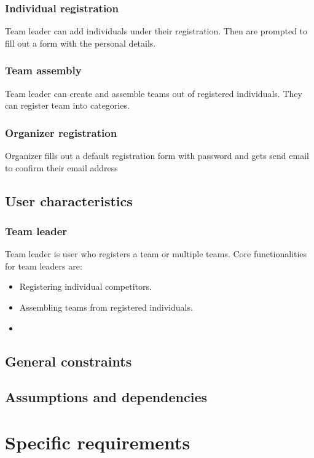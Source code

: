 \documentclass[a4paper]{article}
\begin{document}
	\subsubsection{Individual registration}
	Team leader can add individuals under their registration. Then are prompted to fill out a form with the personal details.
	\subsubsection{Team assembly}
	Team leader can create and assemble teams out of registered individuals. They can register team into categories.
	\subsubsection{Organizer registration}
	Organizer fills out a default registration form with password and gets send email to confirm their email address 
	\subsection{User characteristics}
	\label{sub:users}
	\subsubsection{Team leader}
	Team leader is user who registers a team or multiple teams. Core functionalities for team leaders are:
	\begin{itemize}
		\item Registering individual competitors.
		\item Assembling teams from registered individuals.
		\item  
	\end{itemize} 
	\subsection{General constraints}
	\label{sub:constraints}
	\subsection{Assumptions and dependencies}
	\label{sub:dependencies}
	
	\newpage
	
	\section{Specific requirements}
	\label{sec:specific}
\end{document}
